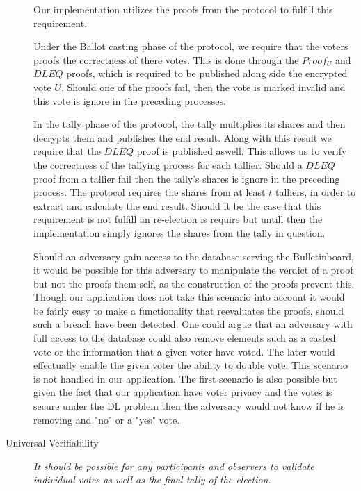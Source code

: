 \begin{description}
        \noindent
        Our implementation utilizes the proofs from the protocol to fulfill this requirement. 
        
        \noindent
        Under the Ballot casting phase of the protocol, we require that the voters proofs the correctness of there votes. This is done through the $Proof_U$ and $DLEQ$ proofs, which is required to be published along side the encrypted vote $U$. Should one of the proofs fail, then the vote is marked invalid and this vote is ignore in the preceding processes. 
        
        \noindent
        In the tally phase of the protocol, the tally multiplies its shares and then decrypts them and publishes the end result. Along with this result we require that the $DLEQ$ proof is published aswell. This allows us to verify the correctness of the tallying process for each tallier. Should a $DLEQ$ proof from a tallier fail then the tally's shares is ignore in the preceding process. The protocol requires the shares from at least $t$ talliers, in order to extract and calculate the end result. Should it 
        be the case that this requirement is not fulfill an re-election is require but untill then the implementation simply ignores the shares from the tally in question.
        
        \noindent
        Should an adversary gain access to the database serving the Bulletinboard, it would be possible for this adversary to manipulate the verdict of a proof but not
        the proofs them self, as the construction of the proofs prevent this. Though our application does not take this scenario into account it would be fairly easy to make
        a functionality that reevaluates the proofs, should such a breach have been detected. One could argue that an adversary with full access to the database could also remove elements such as a casted vote or the information that a given voter have voted. The later would effectually enable the given voter the ability to double vote. This scenario is not handled in our application. The first scenario is also possible but given the fact that our application have voter privacy and the votes is secure under the DL problem then the adversary would not know if he is removing and "no" or a "yes" vote. 
        
        
    \item[Universal Verifiability]
        \textit{It should be possible for any participants and observers to validate individual votes as well as the final tally of the election.}
        

\end{description}
